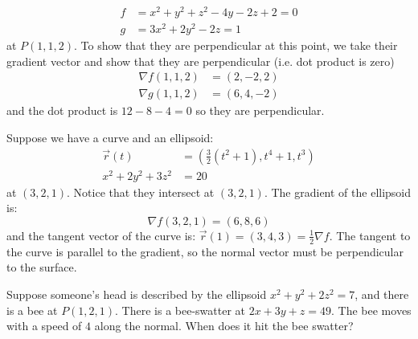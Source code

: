 \begin{itemize}
\begin{example}
        \begin{align}
            f &= x^2+y^2+z^2-4y-2z+2 = 0 \\ 
            g &= 3x^2+2y^2-2z = 1
        \end{align}
        at $P(1,1,2)$. To show that they are perpendicular at this point, we take their gradient vector and show that they are perpendicular (i.e. dot product is zero)
        \begin{align}
            \nabla f(1,1,2) &= (2,-2,2) \\
            \nabla g(1,1,2) &= (6,4,-2)
        \end{align}
        and the dot product is $12-8-4=0$ so they are perpendicular.
    \end{example}
    \begin{example}
        Suppose we have a curve and an ellipsoid:
        \begin{align}
            \vec{r}(t) &= (\frac{3}{2}(t^2+1), t^4+1, t^3) \\ 
            x^2+2y^2+3z^2 &= 20
        \end{align}
        at $(3,2,1)$. Notice that they intersect at $(3,2,1)$. The gradient of the ellipsoid is:
        \begin{equation}
            \nabla f(3,2,1) = (6,8,6)
        \end{equation}
        and the tangent vector of the curve is: $\vec{r}(1)=(3,4,3) = \frac{1}{2}\nabla f$. The tangent to the curve is parallel to the gradient, so the normal vector must be perpendicular to the surface. 
    \end{example}
    \begin{example}
        Suppose someone's head is described by the ellipsoid $x^2+y^2+2z^2=7$, and there is a bee at $P(1,2,1)$. There is a bee-swatter at $2x+3y+z=49$. The bee moves with a speed of $4$ along the normal. When does it hit the bee swatter?
        \vspace{2mm}


\end{example}
\end{itemize}
